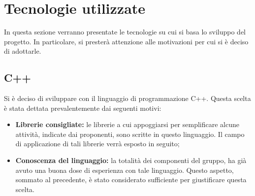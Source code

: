 \section{Tecnologie utilizzate}
\label{tec_utilizzate}
In questa sezione verranno presentate le tecnologie su cui si basa lo sviluppo del progetto. In particolare, si presterà attenzione alle motivazioni per cui si è deciso di adottarle.

	\subsection{C++}
	\label{c++}
	Si è deciso di sviluppare \project{} con il linguaggio di programmazione C++. Questa scelta è stata dettata prevalentemente dai seguenti motivi:
	\begin{itemize}
		\item\textbf{Librerie consigliate:} le librerie a cui appoggiarsi per semplificare alcune attività, indicate dai proponenti, sono scritte in questo linguaggio. Il campo di applicazione di tali librerie verrà esposto in seguito;
		\item\textbf{Conoscenza del linguaggio:} la totalità dei componenti del gruppo, ha già avuto una buona dose di esperienza con tale linguaggio. Questo aspetto, sommato al precedente, è stato considerato sufficiente per giustificare questa scelta.
	\end{itemize}
	
